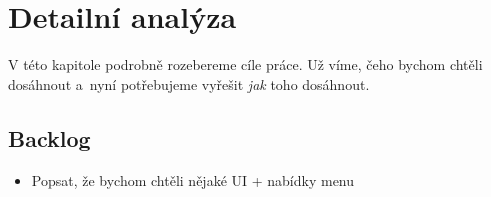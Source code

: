 
\chapter{Detailní analýza}

V této kapitole podrobně rozebereme cíle práce. Už víme, čeho bychom chtěli dosáhnout a~nyní potřebujeme vyřešit \textit{jak} toho dosáhnout.



















\section{Backlog}

\begin{itemize}
	
	\item Popsat, že bychom chtěli nějaké UI + nabídky menu

\end{itemize}
